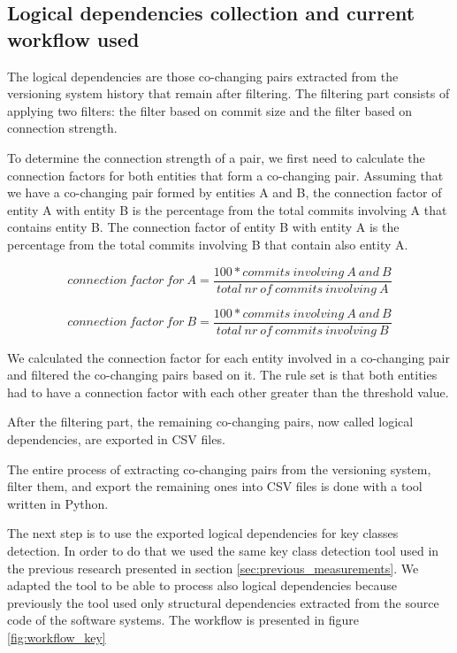 \documentclass[12pt, a4paper, twoside]{report}
\begin{document}
\subsection{Logical dependencies collection and current workflow used}

The logical dependencies are those co-changing pairs extracted from the versioning system history that remain after filtering. The filtering part consists of applying two filters: the filter based on commit size and the filter based on connection strength. 

To determine the connection strength of a pair, we first need to calculate the connection factors for both entities that form a co-changing pair.
Assuming that we have a co-changing pair formed by entities A and B, the connection factor of entity A with entity B is the percentage from the total commits involving A that contains entity B. The connection factor of entity B with entity A is the percentage from the total commits involving B that contain also entity A.

\begin{equation}
 connection\ factor\ for\ A = \frac{100 * commits\ involving\ A\ and\ B}{total\ nr\ of\ commits\ involving\ A}
\end{equation}

\begin{equation}
 connection\ factor\ for\ B = \frac{100 * commits\ involving\ A\ and\ B}{total\ nr\ of\ commits\ involving\ B}
\end{equation}

We calculated the connection factor for each entity involved in a co-changing pair and filtered the co-changing pairs based on it. The rule set is that both entities had to have a connection factor with each other greater than the threshold value.

After the filtering part, the remaining co-changing pairs, now called logical dependencies, are exported in CSV files.

The entire process of extracting co-changing pairs from the versioning system, filter them, and export the remaining ones into CSV files is done with a tool written in Python.

The next step is to use the exported logical dependencies for key classes detection. In order to do that we used the same key class detection tool used in the previous research presented in section \ref{sec:previous_measurements}. We adapted the tool to be able to process also logical dependencies because previously the tool used only structural dependencies extracted from the source code of the software systems. 
The workflow is presented in figure \ref{fig:workflow_key}
\end{document}
